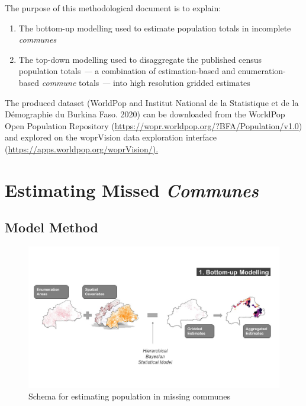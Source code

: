 \documentclass[]{book}
\begin{document}
The purpose of this methodological document is to explain:

\begin{enumerate}
\def\labelenumi{\arabic{enumi}.}
\item
  The bottom-up modelling used to estimate population totals in
  incomplete \emph{communes}
\item
  The top-down modelling used to disaggregate the published census
  population totals \emph{---} a combination of estimation-based and
  enumeration-based \emph{commune} totals \emph{---} into high
  resolution gridded estimates
\end{enumerate}

The produced dataset (WorldPop and Institut National de la Statistique
et de la Démographie du Burkina Faso. 2020) can be downloaded from the
WorldPop Open Population Repository
(\url{https://wopr.worldpop.org/?BFA/Population/v1.0}) and explored on
the woprVision data exploration interface
(\href{https://apps.worldpop.org/woprVision/}{https://apps.worldpop.org/woprVision/).}

\section{\texorpdfstring{Estimating Missed
\emph{Communes}}{Estimating Missed Communes}}\label{estimating-missed-communes}

\subsection{Model Method}\label{model-method}

\begin{figure}

{\centering \includegraphics[width=1\linewidth]{dat/BFAv1/schema1_ENG} 

}

\caption{Schema for estimating population in missing communes}\label{fig:schema1}
\end{figure}
\end{document}
